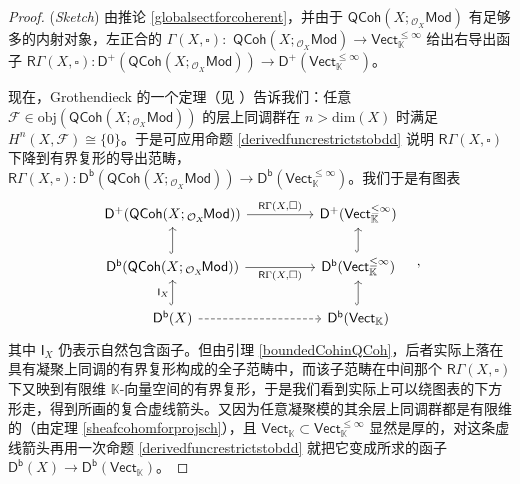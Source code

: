 \begin{proof}(\textit{Sketch})
由推论 \ref{globalsectforcoherent}，并由于 $\mathsf{QCoh}(X;{}_{\mathcal{O}_X}\!\mathsf{Mod})$ 有足够多的内射对象，左正合的 $\Gamma(X,\square):$ $\mathsf{QCoh}(X;{}_{\mathcal{O}_X}\!\mathsf{Mod})\rightarrow\mathsf{Vect}_\mathbb{K}^{\leq\infty}$ 给出右导出函子 $\mathsf{R}\Gamma(X,\square):\mathsf{D^+}(\mathsf{QCoh}(X;{}_{\mathcal{O}_X}\!\mathsf{Mod}))\rightarrow\mathsf{D^+}(\mathsf{Vect}_\mathbb{K}^{\leq\infty})$。 

现在，Grothendieck 的一个定理（见 \cite[Theorem III.2.7]{[Har77]}）告诉我们：任意 $\mathcal{F}\in\text{obj}(\mathsf{QCoh}(X;{}_{\mathcal{O}_X}\!\mathsf{Mod}))$ 的层上同调群在 $n>\text{dim}(X)$ 时满足 $H^n(X,\mathcal{F})\cong\{0\}$。于是可应用命题 \ref{derivedfuncrestrictstobdd} 说明 $\mathsf{R}\Gamma(X,\square)$ 下降到有界复形的导出范畴，$\mathsf{R}\Gamma(X,\square):\mathsf{D^b}(\mathsf{QCoh}(X;{}_{\mathcal{O}_X}\!\mathsf{Mod}))\rightarrow\mathsf{D^b}(\mathsf{Vect}_\mathbb{K}^{\leq\infty})$。我们于是有图表
\begin{equation}\label{diagramforderivedfuncofbdd}
	\begin{tikzcd}
		\mathsf{D^+}(\mathsf{QCoh}(X;{}_{\mathcal{O}_X}\!\mathsf{Mod})) \arrow[rr, "{\mathsf{R}\Gamma(X,\square)}"] & & \mathsf{D^+}(\mathsf{Vect}_\mathbb{K}^{\leq\infty}) \\
		\mathsf{D^b}(\mathsf{QCoh}(X;{}_{\mathcal{O}_X}\!\mathsf{Mod})) \arrow[rr, "{\mathsf{R}\Gamma(X,\square)}"']\arrow[u, hook] & & \mathsf{D^b}(\mathsf{Vect}_\mathbb{K}^{\leq\infty})\arrow[u, hook] \\
		\mathsf{D^b}(X) \arrow[u, hook, "\mathsf{I}_X"]\arrow[rr, dashed] & & \mathsf{D^b}(\mathsf{Vect}_\mathbb{K})\arrow[u, hook]
	\end{tikzcd}\quad,
\end{equation}
其中 $\mathsf{I}_X$ 仍表示自然包含函子。但由引理 \ref{boundedCohinQCoh}，后者实际上落在具有凝聚上同调的有界复形构成的全子范畴中，而该子范畴在中间那个 $\mathsf{R}\Gamma(X,\square)$ 下又映到有限维 $\mathbb{K}$-向量空间的有界复形，于是我们看到实际上可以绕图表的下方形走，得到所画的复合虚线箭头。又因为任意凝聚模的其余层上同调群都是有限维的（由定理 \ref{sheafcohomforprojsch}），且 $\mathsf{Vect}_\mathbb{K}\subset \mathsf{Vect}_\mathbb{K}^{\leq\infty}$ 显然是厚的，对这条虚线箭头再用一次命题 \ref{derivedfuncrestrictstobdd} 就把它变成所求的函子 $\mathsf{D^b}(X)\rightarrow \mathsf{D^b}(\mathsf{Vect}_\mathbb{K})$。   	     
\end{proof}

